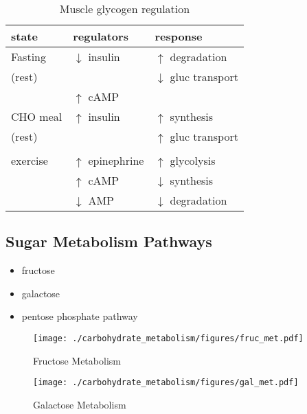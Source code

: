 \documentclass{scrartcl}
\begin{document}
\begin{table}[htbp]
\caption{\label{tab:org4e3c25c}
Muscle glycogen regulation}
\centering
\begin{tabular}{lll}
state & regulators & response\\
\hline
Fasting & \(\downarrow\) insulin & \(\uparrow\) degradation\\
(rest) &  & \(\downarrow\) gluc transport\\
 & \(\uparrow\) cAMP & \\
CHO meal & \(\uparrow\) insulin & \(\uparrow\) synthesis\\
(rest) &  & \(\uparrow\) gluc transport\\
 &  & \\
exercise & \(\uparrow\) epinephrine & \(\uparrow\) glycolysis\\
 & \(\uparrow\) cAMP & \(\downarrow\) synthesis\\
 & \(\downarrow\) AMP & \(\downarrow\) degradation\\
\end{tabular}
\end{table}

\subsection{Sugar Metabolism Pathways}
\label{sec:org57379c1}
\begin{itemize}
\item fructose
\item galactose
\item pentose phosphate pathway
\end{itemize}

\begin{figure}[htbp]
\centering
\texttt{[image: ./carbohydrate\_metabolism/figures/fruc\_met.pdf]}
\caption{\label{fig:orga106158}
Fructose Metabolism}
\end{figure}

\begin{figure}[htbp]
\centering
\texttt{[image: ./carbohydrate\_metabolism/figures/gal\_met.pdf]}
\caption{\label{fig:orgcf0b11d}
Galactose Metabolism}
\end{figure}
\end{document}
